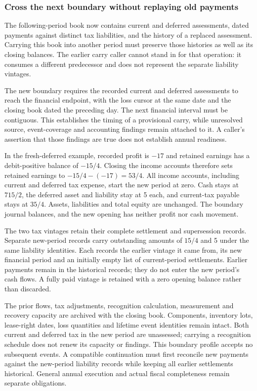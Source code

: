 

\subsubsection*{Cross the next boundary without replaying old payments}
The following-period book now contains current and deferred assessments, dated
payments against distinct tax liabilities, and the history of a replaced
assessment. Carrying this book into another period must preserve those histories
as well as its closing balances. The earlier carry caller cannot stand in for
that operation: it consumes a different predecessor and does not represent the
separate liability vintages.

The new boundary requires the recorded current and deferred assessments to reach
the financial endpoint, with the loss cursor at the same date and the closing
book dated the preceding day. The next financial interval must be contiguous.
This establishes the timing of a provisional carry, while unresolved source,
event-coverage and accounting findings remain attached to it. A caller's
assertion that those findings are true does not establish annual readiness.

In the fresh-deferred example, recorded profit is $-17$ and retained earnings
has a debit-positive balance of $-15/4$. Closing the income accounts therefore
sets retained earnings to $-15/4-(-17)=53/4$. All income accounts, including
current and deferred tax expense, start the new period at zero. Cash stays at
$715/2$, the deferred asset and liability stay at 5 each, and current-tax payable
stays at $35/4$. Assets, liabilities and total equity are unchanged. The boundary
journal balances, and the new opening has neither profit nor cash movement.

The two tax vintages retain their complete settlement and supersession records.
Separate new-period records carry outstanding amounts of $15/4$ and 5 under the
same liability identities. Each records the earlier vintage it came from, its
new financial period and an initially empty list of current-period settlements.
Earlier payments remain in the historical records; they do not enter the new
period's cash flows. A fully paid vintage is retained with a zero opening balance
rather than discarded.

The prior flows, tax adjustments, recognition calculation, measurement and
recovery capacity are archived with the closing book. Components, inventory lots,
lease-right dates, loss quantities and lifetime event identities remain intact.
Both current and deferred tax in the new period are unassessed; carrying a
recognition schedule does not renew its capacity or findings. This boundary
profile accepts no subsequent events. A compatible continuation must first
reconcile new payments against the new-period liability records while keeping
all earlier settlements historical. General annual execution and actual fiscal
completeness remain separate obligations.
